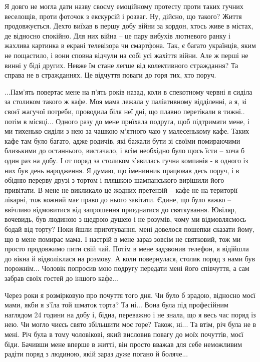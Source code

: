 Я довго не могла дати назву своєму емоційному протесту проти таких гучних
веселощів, проти фоточок з екскурсій і розваг. Ну, дійсно, що такого?
Життя продовжується. Дехто виїхав в першу добу війни за кордон, хтось живе
в містах, де відносно спокійно. Для них війна – це пару вибухів лютневого
ранку і жахлива картинка в екрані телевізора чи смартфона. Так, є багато
українців, яким не пощастило, і вони сповна відчули на собі усі жахіття
війни. Але ж перші не винні у біді других. Невже їм стане легше від
колективного страждання? Та справа не в стражданнях. Це відчуття поваги до
горя тих, хто поруч.

...Пам'ять повертає мене на п'ять років назад, коли в спекотному червні я
сиділа за столиком такого ж кафе. Моя мама лежала у паліативному
відділенні, а я, зі своєї жагучої потреби, проводила біля неї дні, що
плавно перетікали в тижні.. потім в місяці... Одного разу до мене приїхала
подруга, щоб підтримати мене, і ми тихенько сиділи з нею за чашкою
м'ятного чаю у малесенькому кафе. Таких кафе там було  багато, адже
родичів, які бажали бути зі своїми помираючими близькими до останнього,
вистачало, і всім необхідно було щось їсти – хоча б один раз на добу. І от
поряд за столиком з'явилась гучна компанія - в одного із них був день
народження. Я думаю, що іменинник працював десь поруч, і в обідню перерву
друзі з тортом і пляшкою шампанського вирішили його привітати. В мене не
викликало це жодних претензій – кафе не на території лікарні, тож кожний
має право до нього завітати. Єдине, що було важко – ввічливо відмовитися
від запрошення приєднатися до святкування. Ювіляр, вочевидь, був людиною з
щедрою душею і не розумів, чому ми відмовляємось бодай від торту? Поки
йшли приготування, мені довелося пошепки сказати йому, що в мене помирає
мама. І настрій в мене зараз зовсім не святковий, тож ми просто продовжимо
пити свій чай. Потім в мене задзвонив телефон, я відійшла до вікна й
відволіклася на розмову. А коли повернулася, столик поряд з нами був
порожнім... Чоловік попросив мою подругу передати мені його співчуття, а сам
забрав своїх гостей до іншого кафе...

Через роки я розмірковую про почуття того дня. Чи було б зрадою, відносно
моєї мами, якби я з'їла той шматок торта? Та ні... Вона була під професійним
наглядом 24 години на добу і, бідна, переважно і не знала, що я весь час
поряд із нею. Чи могло чиєсь свято збільшити моє горе? Також, ні... Та втім,
річ була не в мені. Річ була в тому чоловікові, який висловив повагу до
моїх почуттів, моєї біди. Бачивши мене вперше в житті, він просто вважав
для себе неможливим радіти поряд з людиною, якій зараз дуже погано й
боляче...


